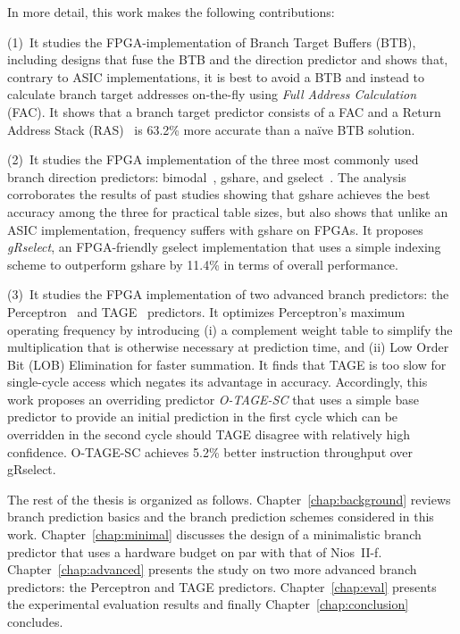 In more detail, this work makes the following contributions:

(1)~It studies the FPGA-implementation of Branch Target Buffers (BTB), including designs that fuse the BTB and the direction predictor and shows that, contrary to ASIC implementations, it is best to avoid a BTB and instead to calculate branch target addresses on-the-fly using \textit{Full Address Calculation} (FAC). It shows that a branch target predictor consists of a FAC and a Return Address Stack (RAS)~\cite{ras} is 63.2\% more accurate than a na\"ive BTB solution.

(2)~It studies the FPGA implementation of the three most commonly used branch direction predictors: bimodal~\cite{bimodal}, gshare, and gselect~\cite{McFarling}. The analysis corroborates the results of past studies showing that gshare achieves the best accuracy among the three for practical table sizes, but also shows that unlike an ASIC implementation, frequency suffers with gshare on FPGAs. It proposes \textit{gRselect}, an FPGA-friendly gselect implementation that uses a simple indexing scheme to outperform gshare by 11.4\% in terms of overall performance.

(3)~It studies the FPGA implementation of two advanced branch predictors: the Perceptron~\cite{perceptron} and TAGE~\cite{tage} predictors. It optimizes Perceptron's maximum operating frequency by introducing (i) a complement weight table to simplify the multiplication that is otherwise necessary at prediction time, and (ii) Low Order Bit (LOB) Elimination for faster summation. It finds that TAGE is too slow for single-cycle access which negates its advantage in accuracy. Accordingly, this work proposes an overriding predictor \mbox{\textit{O-TAGE-SC}} that uses a simple base predictor to provide an initial prediction in the first cycle which can be overridden in the second cycle should TAGE disagree with relatively high confidence. \mbox{O-TAGE-SC} achieves 5.2\% better instruction throughput over gRselect.



The rest of the thesis is organized as follows. Chapter~\ref{chap:background} reviews branch prediction basics and  the branch prediction schemes considered in this work. Chapter~\ref{chap:minimal} discusses the design of a minimalistic branch predictor that uses a hardware budget on par with that of Nios~II-f. Chapter~\ref{chap:advanced} presents the study on two more advanced branch predictors: the Perceptron and TAGE predictors. Chapter~\ref{chap:eval} presents the experimental evaluation results and finally Chapter~\ref{chap:conclusion} concludes.





